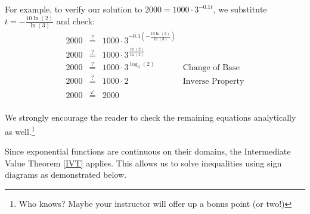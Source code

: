 \documentclass{ximera}
\begin{document}
For example, to verify our solution to  $2000 = 1000 \cdot 3^{-0.1 t}$, we substitute $t = -\frac{10\ln(2)}{\ln(3)}$ and check: 
\[ \begin{array}{rclr}

2000 & \stackrel{?}{=} & 1000 \cdot 3^{-0.1 \left(-\frac{10\ln(2)}{\ln(3)}\right)} & \\
2000 & \stackrel{?}{=} & 1000 \cdot 3^{\frac{\ln(2)}{\ln(3)}} & \\
2000 & \stackrel{?}{=} & 1000 \cdot 3^{\log_{3}(2)} & \text{Change of Base}\\
2000 & \stackrel{?}{=} & 1000 \cdot 2 & \text{Inverse Property}\\
2000 & \stackrel{\checkmark}{=} & 2000 & \\

\end{array}\]

We strongly encourage the reader to check the remaining equations analytically as well.\footnote{Who knows?  Maybe your instructor will offer up a bonus point (or two!)}

Since exponential functions are continuous on their domains, the Intermediate Value Theorem \ref{IVT} applies. This allows us to solve inequalities using sign diagrams as demonstrated below.
\end{document}
